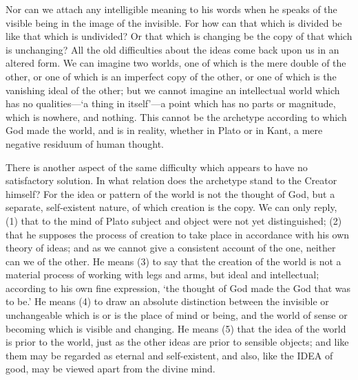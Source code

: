 Nor can we attach any intelligible meaning to his words when he speaks of
the visible being in the image of the invisible. For how can that which is
divided be like that which is undivided? Or that which is changing be the
copy of that which is unchanging? All the old difficulties about the ideas
come back upon us in an altered form. We can imagine two worlds, one of
which is the mere double of the other, or one of which is an imperfect
copy of the other, or one of which is the vanishing ideal of the other;
but we cannot imagine an intellectual world which has no qualities—‘a
thing in itself’—a point which has no parts or magnitude, which is
nowhere, and nothing. This cannot be the archetype according to which God
made the world, and is in reality, whether in Plato or in Kant, a mere
negative residuum of human thought.

There is another aspect of the same difficulty which appears to have no
satisfactory solution. In what relation does the archetype stand to the
Creator himself? For the idea or pattern of the world is not the thought
of God, but a separate, self-existent nature, of which creation is the
copy. We can only reply, (1) that to the mind of Plato subject and object
were not yet distinguished; (2) that he supposes the process of creation
to take place in accordance with his own theory of ideas; and as we cannot
give a consistent account of the one, neither can we of the other. He
means (3) to say that the creation of the world is not a material process
of working with legs and arms, but ideal and intellectual; according to
his own fine expression, ‘the thought of God made the God that was to be.’
He means (4) to draw an absolute distinction between the invisible or
unchangeable which is or is the place of mind or being, and the world of
sense or becoming which is visible and changing. He means (5) that the
idea of the world is prior to the world, just as the other ideas are prior
to sensible objects; and like them may be regarded as eternal and
self-existent, and also, like the IDEA of good, may be viewed apart from
the divine mind.

